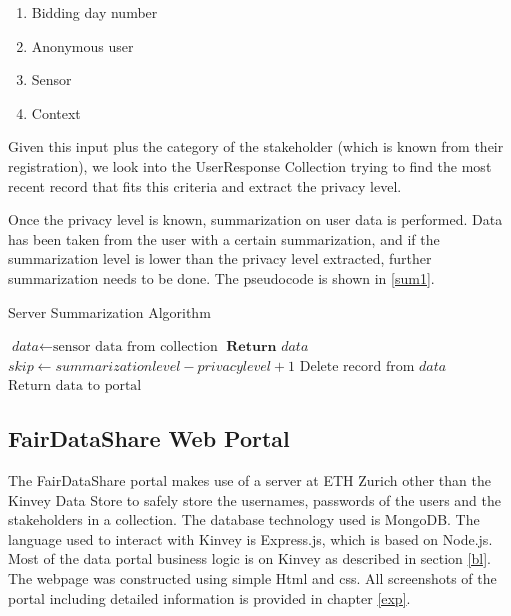 \begin{enumerate}
    \item Bidding day number
    \item Anonymous user
    \item Sensor
    \item Context
\end{enumerate}

Given this input plus the category of the stakeholder (which is known from their registration), we look into the UserResponse Collection trying to find the most recent record that
fits this criteria and extract the privacy level.

Once the privacy level is known, summarization on user data is performed. Data has been taken from the user with a certain summarization, and if the summarization level is lower than the privacy level extracted, further summarization needs to be done. The pseudocode is shown in \ref{sum1}.

\begin{algorithm}
\caption{Server Summarization Algorithm}\label{sum1}
\begin{algorithmic}[1]
\State $\textit{data} \gets \text{sensor data from collection}$
	\State $\textbf{Return }\textit{data}$
\Else
	\State $\textit{skip} \gets \textit{summarizationlevel}-\textit{privacylevel}+1$
 	 \State $\text{Delete record from}\textit{ data}$
 	 \EndFor
\EndIf
\State $\text{Return data to portal}$
\EndProcedure
\end{algorithmic}
\end{algorithm}

\subsection{FairDataShare Web Portal}
The FairDataShare portal makes use of a server at ETH Zurich other than the Kinvey Data Store to safely store the usernames, passwords of the users and the stakeholders in a collection. The database technology used is MongoDB. The language used to interact with Kinvey is Express.js, which is based on Node.js. Most of the data portal business logic is on Kinvey as described in section \ref{bl}. The webpage was constructed using simple Html and css. All screenshots of the portal including detailed information is provided in chapter \ref{exp}.









